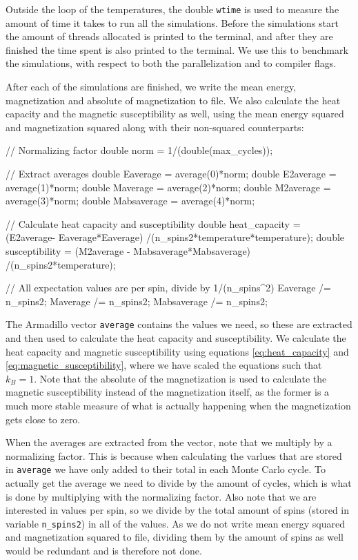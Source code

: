 \documentclass[reprint,english,notitlepage]{revtex4-1}  %
\begin{document}
Outside the loop of the temperatures, the double \verb+wtime+ is used to measure the amount of time it takes to run all the simulations. Before the simulations start the amount of threads allocated is printed to the terminal, and after they are finished the time spent is also printed to the terminal. We use this to benchmark the simulations, with respect to both the parallelization and to compiler flags.

After each of the simulations are finished, we write the mean energy, magnetization and absolute of magnetization to file. We also calculate the heat capacity and the magnetic susceptibility as well, using the mean energy squared and magnetization squared along with their non-squared counterparts:

\begin{cpp}
// Normalizing factor
double norm = 1/(double(max_cycles));

// Extract averages
double Eaverage = average(0)*norm;
double E2average = average(1)*norm;
double Maverage = average(2)*norm;
double M2average = average(3)*norm;
double Mabsaverage = average(4)*norm;

// Calculate heat capacity and susceptibility
double heat_capacity = (E2average- Eaverage*Eaverage)
					   /(n_spins2*temperature*temperature);
double susceptibility = (M2average - Mabsaverage*Mabsaverage)
					    /(n_spins2*temperature);

// All expectation values are per spin, divide by 1/(n_spins^2)
Eaverage /= n_spins2;
Maverage /= n_spins2;
Mabsaverage /= n_spins2;
\end{cpp}

The Armadillo \citep{Armadillo} vector \verb+average+ contains the values we need, so these are extracted and then used to calculate the heat capacity and susceptibility. We calculate the heat capacity and magnetic susceptibility using equations \eqref{eq:heat_capacity} and \eqref{eq:magnetic_susceptibility}, where we have scaled the equations such that $k_B = 1$. Note that the absolute of the magnetization is used to calculate the magnetic susceptibility instead of the magnetization itself, as the former is a much more stable measure of what is actually happening when the magnetization gets close to zero.

When the averages are extracted from the vector, note that we multiply by a normalizing factor. This is because when calculating the varlues that are stored in \verb+average+ we have only added to their total in each Monte Carlo cycle. To actually get the average we need to divide by the amount of cycles, which is what is done by multiplying with the normalizing factor. Also note that we are interested in values per spin, so we divide by the total amount of spins (stored in variable \verb+n_spins2+) in all of the values. As we do not write mean energy squared and magnetization squared to file, dividing them by the amount of spins as well would be redundant and is therefore not done.
\end{document}
